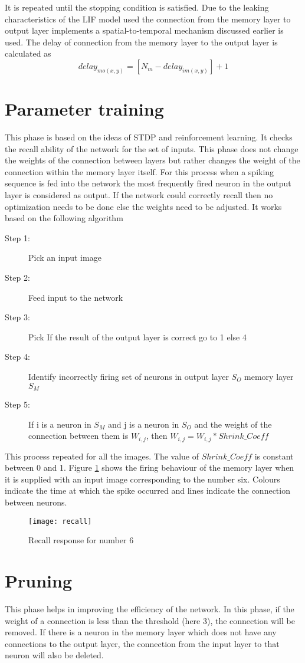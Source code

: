 It is repeated until the stopping condition is satisfied. Due to the leaking
characteristics of the LIF model used the connection from the memory layer to
output layer implements a spatial-to-temporal mechanism discussed earlier is
used. The delay of connection from the memory layer to the output layer is
calculated as
\begin{equation*}
    delay_{mo(x,y)}=[N_m-delay_{im(x,y)}]+1
\end{equation*}
\section{Parameter training}
This phase is based on the ideas of STDP and reinforcement learning. It checks
the recall ability of the network for the set of inputs. This phase does not
change the weights of the connection between layers but rather changes the
weight of the connection within the memory layer itself. For this process when
a spiking sequence is fed into the network the most frequently fired neuron in
the output layer is considered as output. If the network could correctly recall
then no optimization needs to be done else the weights need to be adjusted. It
works based on the following algorithm
\begin{description}
    \item[Step 1:] Pick an input image
    \item[Step 2:] Feed input to the network
    \item[Step 3:] Pick If the result of the output layer is correct go to 1 else 4
    \item[Step 4:] Identify incorrectly firing set of neurons in output layer $S_{O}$
        memory layer $S_{M}$
    \item[Step 5:] If i is a neuron in $S_M$ and j is a neuron in $S_O$ and the weight of
        the connection between them is $W_{i,j}$, then $W_{i,j}=W_{i,j}*Shrink\_Coeff$
\end{description}This process repeated for all
the images. The value of $Shrink\_Coeff$ is constant between 0 and
1. Figure \ref{recall} shows the firing behaviour of the memory layer when it is
supplied with an input image corresponding to the number six. Colours indicate
the time at which the spike occurred and lines indicate the connection between
neurons.
\begin{figure}[h!]
    \centering
    \texttt{[image: recall]}
    \caption{Recall response for number 6}\label{recall}
\end{figure}
\section{Pruning}
This phase helps in improving the efficiency of the network. In this phase, if
the weight of a connection is less than the threshold (here 3), the connection
will be removed. If there is a neuron in the memory layer which does not have
any connections to the output layer, the connection from the input layer to
that neuron will also be deleted.